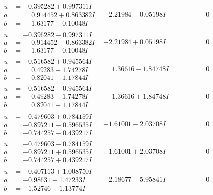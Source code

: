 \documentclass[1p]{elsarticle_modified}
\theoremstyle{definition}
\begin{document}
$$\begin{array}{c|c|c}
\begin{aligned}
u &= -0.395282 + 0.997311 I \\
a &= \phantom{-}0.914452 + 0.863382 I \\
b &= \phantom{-}1.63177 + 0.10048 I\end{aligned}
 & -2.21984 - 0.05198 I & \phantom{-0.000000 } 0 \\ \hline\begin{aligned}
u &= -0.395282 - 0.997311 I \\
a &= \phantom{-}0.914452 - 0.863382 I \\
b &= \phantom{-}1.63177 - 0.10048 I\end{aligned}
 & -2.21984 + 0.05198 I & \phantom{-0.000000 } 0 \\ \hline\begin{aligned}
u &= -0.516582 + 0.945564 I \\
a &= \phantom{-}0.49283 - 1.74278 I \\
b &= \phantom{-}0.82041 - 1.17844 I\end{aligned}
 & \phantom{-}1.36616 - 1.84748 I & \phantom{-0.000000 } 0 \\ \hline\begin{aligned}
u &= -0.516582 - 0.945564 I \\
a &= \phantom{-}0.49283 + 1.74278 I \\
b &= \phantom{-}0.82041 + 1.17844 I\end{aligned}
 & \phantom{-}1.36616 + 1.84748 I & \phantom{-0.000000 } 0 \\ \hline\begin{aligned}
u &= -0.479603 + 0.784159 I \\
a &= -0.897211 - 0.596535 I \\
b &= -0.744257 - 0.439217 I\end{aligned}
 & -1.61001 - 2.03708 I & \phantom{-0.000000 } 0 \\ \hline\begin{aligned}
u &= -0.479603 - 0.784159 I \\
a &= -0.897211 + 0.596535 I \\
b &= -0.744257 + 0.439217 I\end{aligned}
 & -1.61001 + 2.03708 I & \phantom{-0.000000 } 0 \\ \hline\begin{aligned}
u &= -0.407113 + 1.008750 I \\
a &= -0.98531 + 1.47233 I \\
b &= -1.52746 + 1.13774 I\end{aligned}
 & -2.18677 - 5.95841 I & \phantom{-0.000000 } 0 \\ \hline\begin{aligned}

\end{aligned}
\end{array}$$
\end{document}
